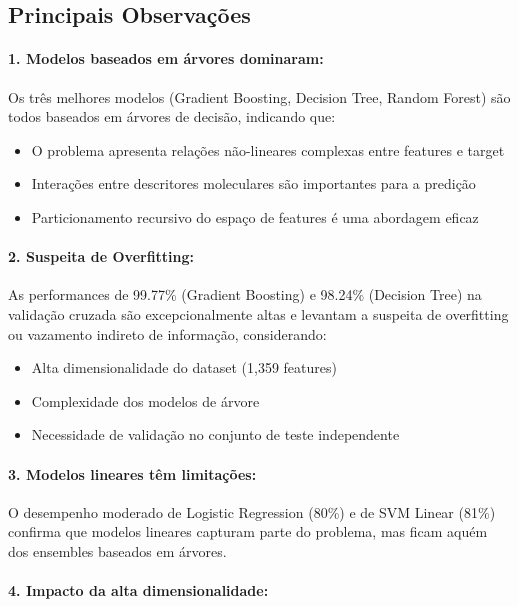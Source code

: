 \documentclass[12pt,a4paper]{article}
\begin{document}
\subsection{Principais Observações}

\paragraph{1. Modelos baseados em árvores dominaram:}

Os três melhores modelos (Gradient Boosting, Decision Tree, Random Forest) são todos baseados em árvores de decisão, indicando que:

\begin{itemize}
    \item O problema apresenta relações não-lineares complexas entre features e target
    \item Interações entre descritores moleculares são importantes para a predição
    \item Particionamento recursivo do espaço de features é uma abordagem eficaz
\end{itemize}

\paragraph{2. Suspeita de Overfitting:}

As performances de 99.77\% (Gradient Boosting) e 98.24\% (Decision Tree) na validação cruzada são excepcionalmente altas e levantam a suspeita de overfitting ou vazamento indireto de informação, considerando:

\begin{itemize}
    \item Alta dimensionalidade do dataset (1,359 features)
    \item Complexidade dos modelos de árvore
    \item Necessidade de validação no conjunto de teste independente
\end{itemize}

\paragraph{3. Modelos lineares têm limitações:}

O desempenho moderado de Logistic Regression (80\%) e de SVM Linear (81\%) confirma que modelos lineares capturam parte do problema, mas ficam aquém dos ensembles baseados em árvores.

\paragraph{4. Impacto da alta dimensionalidade:}
\end{document}
